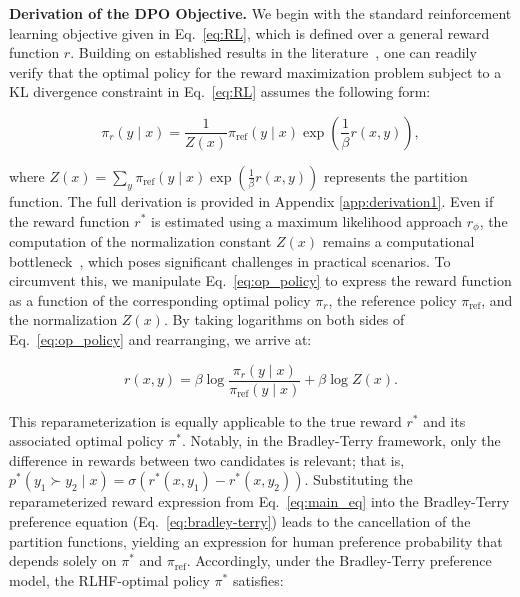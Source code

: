 \textbf{Derivation of the DPO Objective.} We begin with the standard reinforcement learning objective given in Eq.~\ref{eq:RL}, which is defined over a general reward function $r$. Building on established results in the literature~\citep{peters2007reinforcement, peng2019advantage, korbak2022reinforcement, go2023aligning}, one can readily verify that the optimal policy for the reward maximization problem subject to a KL divergence constraint in Eq.~\ref{eq:RL} assumes the following form:

\begin{equation}\label{eq:op_policy}
    \pi_r(y\mid x) = \frac{1}{Z(x)}\pi_\text{ref}(y\mid x)\exp\left(\frac{1}{\beta}r(x, y)\right),
\end{equation}

where $Z(x) =\sum_{y}\pi_\text{ref}(y\mid x)\exp\left(\frac{1}{\beta}r(x, y)\right)$ represents the partition function. The full derivation is provided in Appendix \ref{app:derivation1}. Even if the reward function $r^*$ is estimated using a maximum likelihood approach $r_{\phi}$, the computation of the normalization constant $Z(x)$ remains a computational bottleneck~\citep{korbak2022reinforcement, go2023aligning}, which poses significant challenges in practical scenarios. To circumvent this, we manipulate Eq.~\ref{eq:op_policy} to express the reward function as a function of the corresponding optimal policy $\pi_r$, the reference policy $\pi_\text{ref}$, and the normalization $Z(x)$. By taking logarithms on both sides of Eq.~\ref{eq:op_policy} and rearranging, we arrive at:

\begin{equation}\label{eq:main_eq}
    r(x,y) =\beta \log \frac{\pi_r(y\mid x)}{\pi_\text{ref}(y\mid x)} + \beta \log Z(x).
\end{equation}

This reparameterization is equally applicable to the true reward $r^*$ and its associated optimal policy $\pi^*$. Notably, in the Bradley-Terry framework, only the difference in rewards between two candidates is relevant; that is, ${p^*(y_1 \succ y_2 \mid x) = \sigma(r^*(x, y_1) - r^*(x, y_2))}$. Substituting the reparameterized reward expression from Eq.~\ref{eq:main_eq} into the Bradley-Terry preference equation (Eq.~\ref{eq:bradley-terry}) leads to the cancellation of the partition functions, yielding an expression for human preference probability that depends solely on $\pi^*$ and $\pi_\text{ref}$. Accordingly, under the Bradley-Terry preference model, the RLHF-optimal policy $\pi^*$ satisfies:

